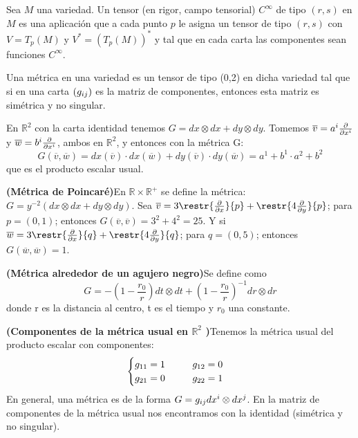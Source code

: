 \documentclass[palatino, bibnumbers]{apuntes}
\begin{document}
\begin{defn} Sea $M$ una variedad. Un tensor (en rigor, campo tensorial) $C^{\infty}$ de tipo $(r,s)$ en $M$ es una aplicación que a cada punto $p$ le asigna un tensor de tipo $(r,s)$ con $V=T_p(M)$ y $V^*=(T_p(M))^*$ y tal que en cada carta las componentes sean funciones $C^{\infty}$.
\end{defn}

\begin{defn}[Métrica] Una métrica en una variedad es un tensor de tipo (0,2) en dicha variedad tal que si en una carta $(g_{i\space j})$ es la matriz de componentes, entonces esta matriz es simétrica y no singular.
\end{defn}

\begin{example}En $ℝ^{2}$ con la carta identidad tenemos $G=dx\otimes dx+dy\otimes dy$. Tomemos $\overline{v}=a^i\pdv{}{x^i}$ y $\overline{w}=b^i\pdv{}{x^i}$, ambos en $ℝ^{2}$, y entonces con la métrica G: $$G(\overline{v},\overline{w})=dx(\overline{v})\cdot dx(\overline{w})+dy(\overline{v})\cdot dy(\overline{w})=a^1+b^1\cdot a^2+b^2$$ que es el producto escalar usual.
\end{example}
\begin{example}\textbf{(Métrica de Poincaré)}\indent En $ℝ×ℝ^+$ se define la métrica:\space$G=y^{-2}(dx\otimes dx+dy\otimes dy)$. Sea $\overline{v}=3\restr{\pdv{}{x}}{p}+\restr{4\pdv{}{y}}{p}$; para $p=(0,1)$; entonces $G(\overline{v},\overline{v})=3^2+4^2=25$. Y si $\overline{w}=3\restr{\pdv{}{x}}{q}+\restr{4\pdv{}{y}}{q}$; para $q=(0,5)$; entonces $G(\overline{w},\overline{w})=1$.
\end{example}
\begin{example}\textbf{(Métrica alrededor de un agujero negro)}\indent Se define como $$G=-\left(1-\frac{r_0}{r}\right)dt\otimes dt+\left(1-\frac{r_0}{r}\right)^{-1}dr\otimes dr$$ donde r es la distancia al centro, t es el tiempo y $r_0$ una constante.
\end{example}
\newpage
\begin{example}\textbf{(Componentes de la métrica usual en $ℝ^2$ )}\indent Tenemos la métrica usual del producto escalar con componentes: $$\begin{cases}
	g_{1\space1}=1 \hspace*{1cm} g_{1\space2}=0\\
	g_{2\space1}=0 \hspace*{1cm} g_{2\space2}=1\\
	\end{cases}$$
	En general, una métrica es de la forma $G=g_{i\space j}dx^i\otimes dx^j$. En la matriz de componentes de la métrica usual nos encontramos con la identidad (simétrica y no singular).
\end{example}
\end{document}
